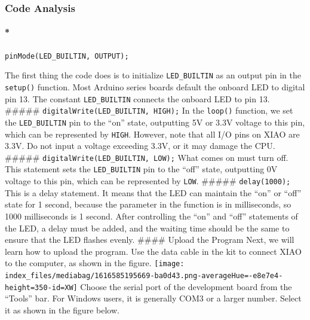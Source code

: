 \documentclass[
  letterpaper,
  DIV=11,
  numbers=noendperiod]{scrreprt}
\let\oldparagraph\paragraph
\renewcommand{\paragraph}[1]{\oldparagraph{#1}\mbox{}}
\begin{document}
\hypertarget{code-analysis}{%
\subsubsection*{Code Analysis}\label{code-analysis}}

\hypertarget{pinmodeled_builtin-output}{%
\paragraph*{\texorpdfstring{\texttt{pinMode(LED\_BUILTIN,\ OUTPUT);}}{pinMode(LED\_BUILTIN, OUTPUT);}}\label{pinmodeled_builtin-output}}

The first thing the code does is to initialize \texttt{LED\_BUILTIN} as
an output pin in the \texttt{setup()} function. Most Arduino series
boards default the onboard LED to digital pin 13. The constant
\texttt{LED\_BUILTIN} connects the onboard LED to pin 13. \#\#\#\#\#
\texttt{digitalWrite(LED\_BUILTIN,\ HIGH);} In the \texttt{loop()}
function, we set the \texttt{LED\_BUILTIN} pin to the ``on'' state,
outputting 5V or 3.3V voltage to this pin, which can be represented by
\texttt{HIGH}. However, note that all I/O pins on XIAO are 3.3V. Do not
input a voltage exceeding 3.3V, or it may damage the CPU. \#\#\#\#\#
\texttt{digitalWrite(LED\_BUILTIN,\ LOW);} What comes on must turn off.
This statement sets the \texttt{LED\_BUILTIN} pin to the ``off'' state,
outputting 0V voltage to this pin, which can be represented by
\texttt{LOW}. \#\#\#\#\# \texttt{delay(1000);} This is a delay
statement. It means that the LED can maintain the ``on'' or ``off''
state for 1 second, because the parameter in the function is in
milliseconds, so 1000 milliseconds is 1 second. After controlling the
``on'' and ``off'' statements of the LED, a delay must be added, and the
waiting time should be the same to ensure that the LED flashes evenly.
\#\#\#\# Upload the Program Next, we will learn how to upload the
program. Use the data cable in the kit to connect XIAO to the computer,
as shown in the figure.
\texttt{[image: index\_files/mediabag/1616585195669-ba0d43.png-averageHue=-e8e7e4-height=350-id=XW]}
Choose the serial port of the development board from the ``Tools'' bar.
For Windows users, it is generally COM3 or a larger number. Select it as
shown in the figure below.
\end{document}
